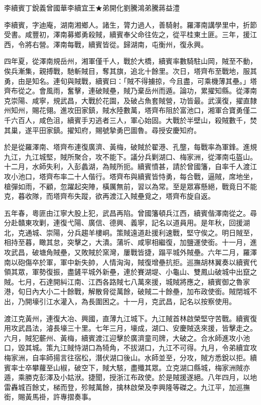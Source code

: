 
\begin{pinyinscope}
李續賓丁銳義曾國華李續宜王★弟開化劉騰鴻弟騰蔣益澧

李續賓，字迪庵，湖南湘鄉人。諸生，膂力過人，善騎射。羅澤南講學里中，折節受書。咸豐初，澤南募鄉勇殺賊，續賓奉父命往佐之，從平桂東土匪。三年，援江西，令將右營。澤南每戰，續賓皆從。歸湖南，屯衡州，復永興。

四年夏，從澤南規岳州，湘軍僅千人，戰於大橋，續賓率數騎駐山岡，賊至不動，俟兵漸集，親搏戰，馳斬賊目，奪其旗，追北十餘里。次日，塔齊布至戰地，服其勇，由是知名。連旬與賊戰，續賓曰：「賊不得擄掠，今且盡，可乘機薄其壘。」塔齊布從之。會風雨，奮擊，連破賊壘，賊乃棄岳州而遁。論功，累擢知縣。從澤南克崇陽、咸寧，規武昌，大戰於花園，及破占魚套賊營，功皆最。武漢復，擢直隸州知州，賜花翎。進攻田家鎮，賊水陸數萬，塔齊布阻於富池口，湘軍合寶勇僅二千六百人，咸色沮，續賓手刃逃者三人，軍心始固。大戰於半壁山，殺賊數千，焚其巢，遂平田家鎮。擢知府，賜號摯勇巴圖魯。尋授安慶知府。

於是從羅澤南、塔齊布連復廣濟、黃梅，破賊於翟港、孔壟，每戰率為軍鋒。進規九江，九江城堅，賊所聚合，攻不能下。議分兵剿湖口、梅家洲，從澤南屯盔山。十二月，水師失利，入彭蠡湖，為賊所扼。續賓憤甚，請於曾國籓，自率千人渡江攻小池口，塔齊布率二十人偕行。塔齊布與續賓皆恃勇，每合戰，逼賊，席地坐，槍彈如雨，不顧，忽躍起突陣，橫厲無前，習以為常。至是眾寡懸絕，戰竟日不能克，暮收隊，而塔齊布失蹤，欲再渡江入賊壘覓之，塔齊布旋自返。

五年春，粵匪由江寧大股上犯，武昌再陷。曾國籓頓兵江西，續賓偕澤南從之。尋分赴贛東攻剿，連復弋陽、廣信、德興、義寧，記名以道員用。是年秋，回援湖北，克通城、崇陽，分兵趨羊樓峒。策賊遠道赴援利速戰，堅守俟之。明日賊至，相持至暮，瞰其怠，突擊之，大潰。蒲圻、咸寧相繼復，加鹽運使銜。十一月，進攻武昌，破塘角賊壘，又敗賊於窯灣，屢戰皆捷，蹋平城外賊壘。六年二月，羅澤南以砲傷卒於軍，軍中新失帥，人情洶洶，賊復增壘抗拒。巡撫胡林翼奏以續賓代領其眾，軍勢復振，盡鏟平城外新壘，連於賽湖堤、小龜山、雙鳳山破城中出竄之賊。七月，石達開糾江南、江西各路賊七八萬來援，城賊將應之，續賓御之魯家港，旬日內大小二十餘戰，解散脅從萬餘，破賊二十餘壘，加布政使銜。賊閉城不出，乃開壕引江水灌入，為長圍困之。十一月，克武昌，記名以按察使用。

渡江克黃州，連復大冶、興國，直薄九江城下。九江賊首林啟榮堅守苦戰。續賓復用攻武昌法，濬長壕三十里。七年三月，壕成，湖口、安慶賊迭來援，皆擊走之。六月，賊犯蘄州、黃梅，續賓渡江迎擊於廣濟童司牌，大破之。合水師進攻小池口，毀其城。策九江賊恃湖口為犄角，不拔湖口，九江不可得。九月，令弟續宜攻梅家洲，自率師揚言往宿松，潛伏湖口後山。水師並至，分攻，賊方悉銳以拒。續賓率士卒攀蘿至山椒，破空下，賊大駭，盡殲其眾。立克湖口縣城，梅家洲賊亦遁，乘勝克彭澤及小姑洑。捷聞，授浙江布政使。於是賊援遂絕。八年四月，以地雷轟城百餘丈，梯而登，殄賊萬餘，擒林啟榮及李興隆等磔之。九江平，加巡撫銜，賜黃馬褂，許專摺奏事。


\end{pinyinscope}
